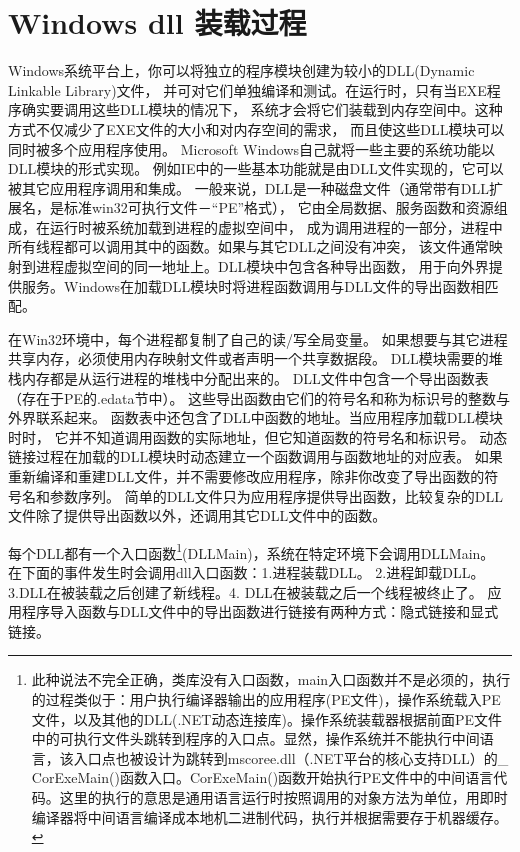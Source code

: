 \documentclass{book}
\begin{document}
\section{Windows dll 装载过程 }

Windows系统平台上，你可以将独立的程序模块创建为较小的DLL(Dynamic Linkable Library)文件，
并可对它们单独编译和测试。在运行时，只有当EXE程序确实要调用这些DLL模块的情况下，
系统才会将它们装载到内存空间中。这种方式不仅减少了EXE文件的大小和对内存空间的需求，
而且使这些DLL模块可以同时被多个应用程序使用。
Microsoft Windows自己就将一些主要的系统功能以DLL模块的形式实现。
例如IE中的一些基本功能就是由DLL文件实现的，它可以被其它应用程序调用和集成。
一般来说，DLL是一种磁盘文件（通常带有DLL扩展名，是标准win32可执行文件－“PE”格式），
它由全局数据、服务函数和资源组成，在运行时被系统加载到进程的虚拟空间中，
成为调用进程的一部分，进程中所有线程都可以调用其中的函数。如果与其它DLL之间没有冲突，
该文件通常映射到进程虚拟空间的同一地址上。DLL模块中包含各种导出函数，
用于向外界提供服务。Windows在加载DLL模块时将进程函数调用与DLL文件的导出函数相匹配。

在Win32环境中，每个进程都复制了自己的读/写全局变量。
如果想要与其它进程共享内存，必须使用内存映射文件或者声明一个共享数据段。
DLL模块需要的堆栈内存都是从运行进程的堆栈中分配出来的。
DLL文件中包含一个导出函数表（存在于PE的.edata节中）。
这些导出函数由它们的符号名和称为标识号的整数与外界联系起来。
函数表中还包含了DLL中函数的地址。当应用程序加载DLL模块时时，
它并不知道调用函数的实际地址，但它知道函数的符号名和标识号。
动态链接过程在加载的DLL模块时动态建立一个函数调用与函数地址的对应表。
如果重新编译和重建DLL文件，并不需要修改应用程序，除非你改变了导出函数的符号名和参数序列。
简单的DLL文件只为应用程序提供导出函数，比较复杂的DLL文件除了提供导出函数以外，还调用其它DLL文件中的函数。
         
每个DLL都有一个入口函数\footnote{此种说法不完全正确，类库没有入口函数，main入口函数并不是必须的，执行的过程类似于：用户执行编译器输出的应用程序(PE文件)，操作系统载入PE文件，以及其他的DLL(.NET动态连接库)。操作系统装载器根据前面PE文件中的可执行文件头跳转到程序的入口点。显然，操作系统并不能执行中间语言，该入口点也被设计为跳转到mscoree.dll（.NET平台的核心支持DLL）的\_ CorExeMain()函数入口。CorExeMain()函数开始执行PE文件中的中间语言代码。这里的执行的意思是通用语言运行时按照调用的对象方法为单位，用即时编译器将中间语言编译成本地机二进制代码，执行并根据需要存于机器缓存。}(DLLMain)，系统在特定环境下会调用DLLMain。
在下面的事件发生时会调用dll入口函数：1.进程装载DLL。
2.进程卸载DLL。3.DLL在被装载之后创建了新线程。4. DLL在被装载之后一个线程被终止了。
应用程序导入函数与DLL文件中的导出函数进行链接有两种方式：隐式链接和显式链接。
         
\end{document}
